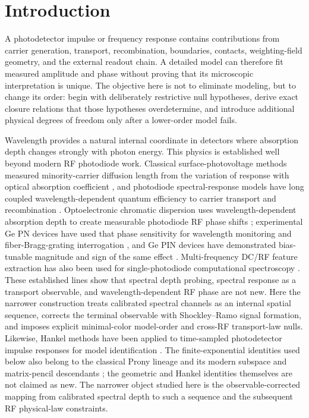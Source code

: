 \documentclass[11pt]{article}
\begin{document}
\section{Introduction}

A photodetector impulse or frequency response contains contributions from carrier generation, transport, recombination, boundaries, contacts, weighting-field geometry, and the external readout chain. A detailed model can therefore fit measured amplitude and phase without proving that its microscopic interpretation is unique. The objective here is not to eliminate modeling, but to change its order: begin with deliberately restrictive null hypotheses, derive exact closure relations that those hypotheses overdetermine, and introduce additional physical degrees of freedom only after a lower-order model fails.

Wavelength provides a natural internal coordinate in detectors where absorption depth changes strongly with photon energy. This physics is established well beyond modern RF photodiode work. Classical surface-photovoltage methods measured minority-carrier diffusion length from the variation of response with optical absorption coefficient \cite{Goodman1961}, and photodiode spectral-response models have long coupled wavelength-dependent quantum efficiency to carrier transport and recombination \cite{Geist1980}. Optoelectronic chromatic dispersion uses wavelength-dependent absorption depth to create measurable photodiode RF phase shifts \cite{Glasser2021}; experimental Ge PN devices have used that phase sensitivity for wavelength monitoring and fiber-Bragg-grating interrogation \cite{Liokumovitch2021}, and Ge PIN devices have demonstrated bias-tunable magnitude and sign of the same effect \cite{Dutta2024}. Multi-frequency DC/RF feature extraction has also been used for single-photodiode computational spectroscopy \cite{Kassa2026}. These established lines show that spectral depth probing, spectral response as a transport observable, and wavelength-dependent RF phase are not new. Here the narrower construction treats calibrated spectral channels as an internal spatial sequence, corrects the terminal observable with Shockley--Ramo signal formation, and imposes explicit minimal-color model-order and cross-RF transport-law nulls. Likewise, Hankel methods have been applied to time-sampled photodetector impulse responses for model identification \cite{Sun2025}. The finite-exponential identities used below also belong to the classical Prony lineage and its modern subspace and matrix-pencil descendants \cite{Prony1795,RoyKailath1989,HuaSarkar1990}; the geometric and Hankel identities themselves are not claimed as new. The narrower object studied here is the observable-corrected mapping from calibrated spectral depth to such a sequence and the subsequent RF physical-law constraints.
\end{document}
